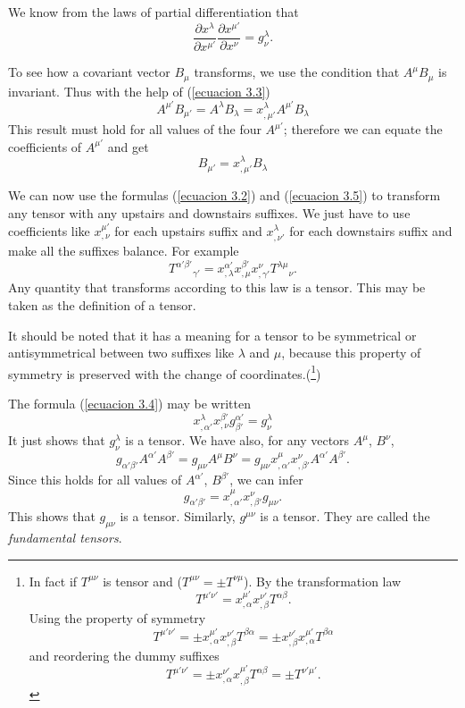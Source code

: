 We know from the laws of partial differentiation that
\begin{equation}
 \label{ecuacion 3.4}
 \frac{\partial x^{\lambda}}{\partial x^{\mu'}} 
\frac{\partial x^{\mu'}}{\partial x^{\nu}} = g^{\lambda}_{\nu}.
\end{equation}

To see how a covariant vector $B_{\mu}$ transforms, we use the condition that 
$A^{\mu} B_{\mu}$ is invariant. Thus with the help of (\ref{ecuacion 3.3})
\[
    A^{\mu'} B_{\mu'} 
    = A^{\lambda} B_{\lambda} 
    = x^{\lambda}_{,\mu'}A^{\mu'} B_{\lambda}
\]
This result must hold for all values of the four $A^{\mu'}$; therefore we can 
equate the coefficients of $A^{\mu'}$ and get
\begin{equation}
 \label{ecuacion 3.5}
 B_{\mu'} = x^{\lambda}_{,\mu'} B_{\lambda}
\end{equation}

We can now use the formulas (\ref{ecuacion 3.2}) and (\ref{ecuacion 3.5}) to 
transform any tensor with any upstairs and downstairs suffixes. We just have to 
use coefficients like $x^{\mu'}_{,\nu}$ for each upstairs suffix and 
$x^{\lambda}_{,\nu'}$ for each downstairs suffix and make all the suffixes 
balance. For example
\begin{equation}
 \label{ecuacion 3.6}
 {T^{\alpha'\beta'}}_{\gamma'} =
    x^{\alpha'}_{,\lambda}x^{\beta'}_{,\mu}x^{\nu}_{,\gamma'} 
    {T^{\lambda\mu}}_{\nu}.
\end{equation}
Any quantity that transforms according to this law is a tensor. This may be 
taken as the definition of a tensor.

It should be noted that it has a meaning for a tensor to be symmetrical or 
antisymmetrical between two suffixes like $\lambda$ and $\mu$, because this 
property of symmetry is preserved with the change of coordinates.(\footnote{
In fact if $T^{\mu\nu}$ is tensor and ($T^{\mu\nu} = \pm T^{\nu\mu}$). By 
the transformation law 
\[T^{\mu'\nu'} = x^{\mu'}_{,\alpha} x^{\nu'}_{,\beta}T^{\alpha\beta}.\]
Using the property of symmetry
\[T^{\mu'\nu'} = \pm x^{\mu'}_{,\alpha} x^{\nu'}_{,\beta}T^{\beta\alpha}
               = \pm x^{\nu'}_{,\beta}  x^{\mu'}_{,\alpha}T^{\beta\alpha}\]
and reordering the dummy suffixes
\[T^{\mu'\nu'} = \pm x^{\nu'}_{,\alpha} x^{\mu'}_{,\beta}T^{\alpha\beta}
               = \pm T^{\nu'\mu'}.\]
})

The formula (\ref{ecuacion 3.4}) may be written
\[
    x^{\lambda}_{,\alpha'}x^{\beta'}_{,\nu} 
    g^{\alpha'}_{\beta'} = g^{\lambda}_{\nu}
\]
It just shows that $g^{\lambda}_{\nu}$ is a tensor. We have also, for any 
vectors $A^\mu$, $B^\nu$,
\[
    g_{\alpha'\beta'} A^{\alpha'} A^{\beta'} = g_{\mu\nu} A^\mu B^\nu
    = g_{\mu\nu} x^{\mu}_{,\alpha'} x^{\nu}_{,\beta'} A^{\alpha'} A^{\beta'}.
\]
Since this holds for all values of $A^{\alpha'}$, $B^{\beta'}$, we can infer
\begin{equation}
 \label{equation 3.7}
 g_{\alpha'\beta'} = x^{\mu}_{,\alpha'} x^{\nu}_{,\beta'} g_{\mu\nu}.
\end{equation}
This shows that $g_{\mu\nu}$ is a tensor. Similarly, $g^{\mu\nu}$ is a tensor. 
They are called the \emph{fundamental tensors}.

